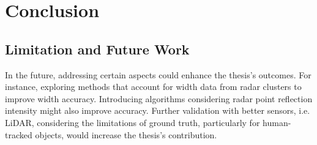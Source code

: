
\chapter{Conclusion}\label{chap:conclusion}


\section{Limitation and Future Work}
In the future, addressing certain aspects could enhance the thesis's outcomes. 
For instance, exploring methods that account for width data from radar clusters to improve width accuracy. 
Introducing algorithms considering radar point reflection intensity might also improve accuracy. 
Further validation with better sensors, i.e. LiDAR, considering the limitations of ground truth, 
particularly for human-tracked objects, would increase the thesis's contribution.



